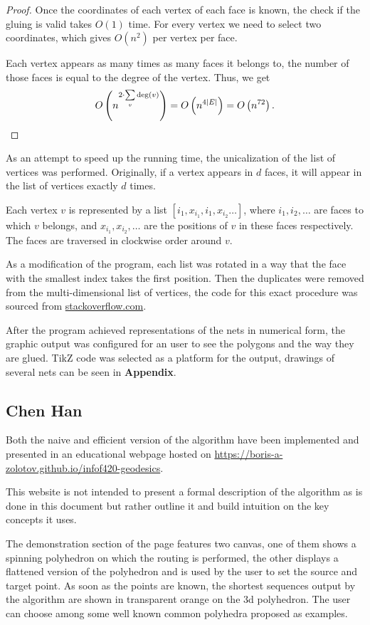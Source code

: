 \documentclass[a4paper,11pt]{article}
\begin{document}
\begin{proof}
	Once the coordinates of each vertex of each face is known, the check if the gluing is valid takes $O(1)$ time. For every vertex we need to select two coordinates, which gives $O(n^2)$ per vertex per face.

	Each vertex appears as many times as many faces it belongs to, the number of those faces is equal to the degree of the vertex. Thus, we get
	\[ O \left( n^{2 \cdot \sum\limits_v \deg (v)} \right)
		= O \left( n^{4 |E|} \right)
		= O \left( n^{72} \right) . \]
\end{proof}

As an attempt to speed up the running time, the unicalization of the list of vertices was performed. Originally, if a vertex appears in $d$ faces, it will appear in the list of vertices exactly $d$ times.

Each vertex $v$ is represented by a list $\left[ i_1, x_{i_1}, i_1, x_{i_2} \ldots \right]$, where $i_1, i_2, \ldots$ are faces to which $v$ belongs, and $x_{i_1}, x_{i_2}, \ldots$ are the positions of $v$ in these faces respectively. The faces are traversed in clockwise order around $v$.

As a modification of the program, each list was rotated in a way that the face with the smallest index takes the first position. Then the duplicates were removed from the multi-dimensional list of vertices, the code for this exact procedure was sourced from \url{stackoverflow.com}.

After the program achieved representations of the nets in numerical form, the graphic output was configured for an user to see the polygons and the way they are glued. TikZ code was selected as a platform for the output, drawings of several nets can be seen in {\bf Appendix}.

\subsection{Chen Han}

Both the naive and efficient version of the algorithm have been implemented and presented in an educational webpage hosted on \url{https://boris-a-zolotov.github.io/infof420-geodesics}.

This website is not intended to present a formal description of the algorithm as is done in this document but rather outline it and build intuition on the key concepts it uses.

The demonstration section of the page features two canvas, one of them shows a spinning polyhedron on which the routing is performed, the other displays a flattened version of the polyhedron and is used by the user to set the source and target point. As soon as the points are known, the shortest sequences output by the algorithm are shown in transparent orange on the 3d polyhedron. The user can choose among some well known common polyhedra proposed as examples.
\end{document}
